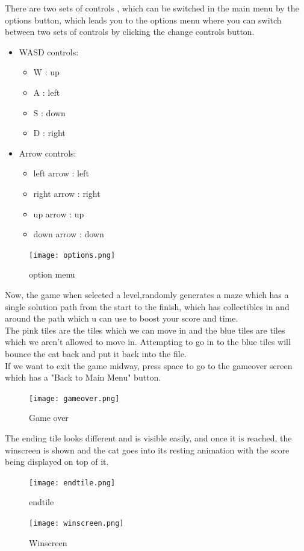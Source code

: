 \documentclass{article}
\begin{document}
There are two sets of controls , which can be switched in the main menu by the options button, which leads you to the options menu where you can switch between two sets of controls by clicking the change controls button.
\begin{itemize}
    \item WASD controls:\begin{itemize}
        \item W : up
        \item A : left
        \item S : down
        \item D : right
    \end{itemize}
    \item Arrow controls:\begin{itemize}
        \item left arrow : left
        \item right arrow : right
        \item up arrow : up
        \item down arrow : down
    \end{itemize}
\end{itemize}
\begin{figure}[H]
    \centering
    \texttt{[image: options.png]}
    \caption{option menu}
    \label{fig:option}
\end{figure}
Now, the game when selected a level,randomly generates a maze which has a single solution path from the start to the finish, which has collectibles in and around the path which u can use to boost your score and time.\\
The pink tiles are the tiles which we can move in and the blue tiles are tiles which we aren't allowed to move in. Attempting to go in to the blue tiles will bounce the cat back and put it back into the file.\\
If we want to exit the game midway, press space to go to the gameover screen which has a "Back to Main Menu" button.\\
\begin{figure}[H]
    \centering
    \texttt{[image: gameover.png]}
    \caption{Game over}
    \label{fig:game_over}
\end{figure}
The ending tile looks different and is visible easily, and once it is reached, the winscreen is shown and the cat goes into its resting animation with the score being displayed on top of it.\\
\begin{figure}[H]
    \centering
    \texttt{[image: endtile.png]}
    \caption{endtile}
    \label{fig:endtile}
\end{figure}
\begin{figure}[H]
    \centering
    \texttt{[image: winscreen.png]}
    \caption{Winscreen}
    \label{fig:winscreen}
\end{figure}
\end{document}
